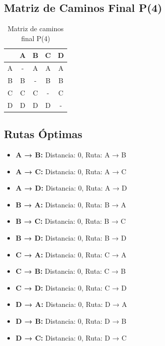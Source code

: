 \documentclass[12pt]{article}
\begin{document}
\clearpage
\subsection{Matriz de Caminos Final P(4)}
\begin{table}[h!]
\centering
\begin{tabular}{|c|c|c|c|c|}
\hline
 & A & B & C & D \\\hline
A & - & A & A & A \\\hline
B & B & - & B & B \\\hline
C & C & C & - & C \\\hline
D & D & D & D & - \\\hline
\end{tabular}
\caption{Matriz de caminos final P(4)}
\end{table}

\clearpage
\subsection{Rutas Óptimas}
\begin{itemize}
\item \textbf{A → B:} Distancia: 0, Ruta: A → B
\item \textbf{A → C:} Distancia: 0, Ruta: A → C
\item \textbf{A → D:} Distancia: 0, Ruta: A → D
\item \textbf{B → A:} Distancia: 0, Ruta: B → A
\item \textbf{B → C:} Distancia: 0, Ruta: B → C
\item \textbf{B → D:} Distancia: 0, Ruta: B → D
\item \textbf{C → A:} Distancia: 0, Ruta: C → A
\item \textbf{C → B:} Distancia: 0, Ruta: C → B
\item \textbf{C → D:} Distancia: 0, Ruta: C → D
\item \textbf{D → A:} Distancia: 0, Ruta: D → A
\item \textbf{D → B:} Distancia: 0, Ruta: D → B
\item \textbf{D → C:} Distancia: 0, Ruta: D → C
\end{itemize}
\end{document}
